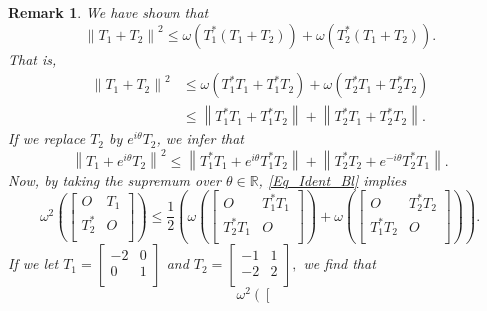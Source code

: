 \documentclass[12pt,twoside,reqno]{amsart}
\newtheorem{remark}{Remark}[section]
\numberwithin{equation}{section}
\begin{document}
\begin{remark}
We have shown that
	\[{{\left\| {{T}_{1}}+{{T}_{2}} \right\|}^{2}}\le \omega \left( T_{1}^{*}\left( {{T}_{1}}+{{T}_{2}} \right) \right)+\omega \left( T_{2}^{*}\left( {{T}_{1}}+{{T}_{2}} \right) \right).\]
That is,
	\[\begin{aligned}
   {{\left\| {{T}_{1}}+{{T}_{2}} \right\|}^{2}}&\le \omega \left( T_{1}^{*}{{T}_{1}}+T_{1}^{*}{{T}_{2}} \right)+\omega \left( T_{2}^{*}{{T}_{1}}+T_{2}^{*}{{T}_{2}} \right) \\ 
 & \le \left\| T_{1}^{*}{{T}_{1}}+T_{1}^{*}{{T}_{2}} \right\|+\left\| T_{2}^{*}{{T}_{1}}+T_{2}^{*}{{T}_{2}} \right\|.  
\end{aligned}\]
If we replace ${{T}_{2}}$ by ${{e}^{i\theta }}{{T}_{2}}$, we infer that
	\[{{\left\| {{T}_{1}}+{{e}^{i\theta }}{{T}_{2}} \right\|}^{2}}\le \left\| T_{1}^{*}{{T}_{1}}+{{e}^{i\theta }}T_{1}^{*}{{T}_{2}} \right\|+\left\| T_{2}^{*}{{T}_{2}}+{{e}^{-i\theta }}T_{2}^{*}{{T}_{1}} \right\|.\]
Now, by taking the supremum over $\theta \in \mathbb{R}$, \eqref{Eq_Ident_Bl} implies
\begin{equation}\label{Eq_Ned_02}	
	{{\omega }^{2}}\left( \left[ \begin{matrix}
   O & {{T}_{1}}  \\
   T_{2}^{*} & O  \\
\end{matrix} \right] \right)\le \frac{1}{2}\left( \omega \left( \left[ \begin{matrix}
   O & T_{1}^{*}{{T}_{1}}  \\
   T_{2}^{*}{{T}_{1}} & O  \\
\end{matrix} \right] \right)+\omega \left( \left[ \begin{matrix}
   O & T_{2}^{*}{{T}_{2}}  \\
   T_{1}^{*}{{T}_{2}} & O  \\
\end{matrix} \right] \right) \right).
\end{equation}
If we let
\(T_1=\left[
\begin{array}{cc}
 -2 & 0 \\
 0 & 1 \\
\end{array}
\right]\) and $T_2=\left[
\begin{array}{cc}
 -1 & 1 \\
 -2 & 2 \\
\end{array}
\right],$ we find that
\[{{\omega }^{2}}\left( \left[ \begin{matrix}

\end{matrix}\]
\end{remark}
\end{document}
